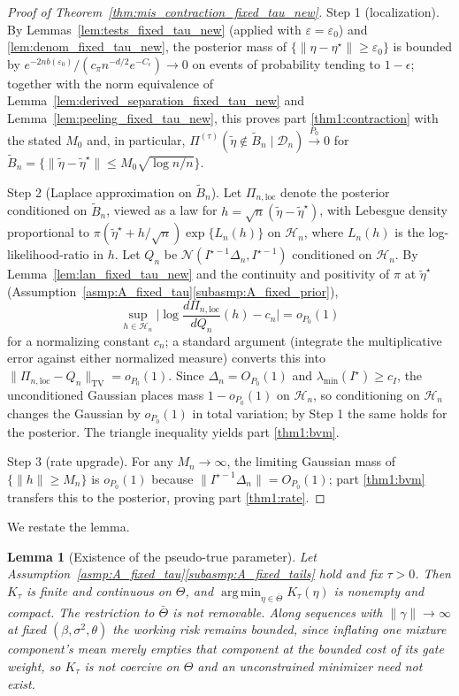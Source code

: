 \documentclass[11pt]{article}
\newtheorem{lemma}{Lemma}
\theoremstyle{definition}
\theoremstyle{plain}
\DeclareMathOperator*{\argmin}{arg\,min}
\begin{document}
\begin{proof}[Proof of Theorem~\ref{thm:mis_contraction_fixed_tau_new}]
Step 1 (localization). By Lemmas~\ref{lem:tests_fixed_tau_new} (applied with $\varepsilon=\varepsilon_0$) and \ref{lem:denom_fixed_tau_new}, the posterior mass of $\{\|\eta-\eta^\star\|\ge\varepsilon_0\}$ is bounded by
$e^{-2nb(\varepsilon_0)}/(c_\pi n^{-d/2}e^{-C_\epsilon})\to0$
on events of probability tending to $1-\epsilon$; together with the norm equivalence of Lemma~\ref{lem:derived_separation_fixed_tau_new} and Lemma~\ref{lem:peeling_fixed_tau_new}, this proves part \ref{thm1:contraction} with the stated $M_0$ and, in particular,
$\Pi^{(\tau)}(\tilde\eta\notin\tilde B_n\mid\mathcal D_n)\xrightarrow{P_0}0$ for
$\tilde B_n=\{\|\tilde\eta-\tilde\eta^\star\|\le M_0\sqrt{\log n/n}\}$.

Step 2 (Laplace approximation on $\tilde B_n$). Let $\Pi_{n,\mathrm{loc}}$ denote the posterior conditioned on $\tilde B_n$, viewed as a law for $h=\sqrt n(\tilde\eta-\tilde\eta^\star)$, with Lebesgue density proportional to
$\pi(\tilde\eta^\star+h/\sqrt n)\exp\{L_n(h)\}$ on $\mathcal H_n$, where $L_n(h)$ is the log-likelihood-ratio in $h$. Let $Q_n$ be $\mathcal N(I^{\star-1}\Delta_n,I^{\star-1})$ conditioned on $\mathcal H_n$. By Lemma~\ref{lem:lan_fixed_tau_new} and the continuity and positivity of $\pi$ at $\tilde\eta^\star$ (Assumption~\ref{asmp:A_fixed_tau}\ref{subasmp:A_fixed_prior}),
\[
\sup_{h\in\mathcal H_n}\Big|\log\frac{d\Pi_{n,\mathrm{loc}}}{dQ_n}(h)-c_n\Big|=o_{P_0}(1)
\]
for a normalizing constant $c_n$; a standard argument (integrate the multiplicative error against either normalized measure) converts this into
$\|\Pi_{n,\mathrm{loc}}-Q_n\|_{\mathrm{TV}}=o_{P_0}(1)$. Since $\Delta_n=O_{P_0}(1)$ and $\lambda_{\min}(I^\star)\ge c_I$, the unconditioned Gaussian places mass $1-o_{P_0}(1)$ on $\mathcal H_n$, so conditioning on $\mathcal H_n$ changes the Gaussian by $o_{P_0}(1)$ in total variation; by Step 1 the same holds for the posterior. The triangle inequality yields part \ref{thm1:bvm}.

Step 3 (rate upgrade). For any $M_n\to\infty$, the limiting Gaussian mass of $\{\|h\|\ge M_n\}$ is $o_{P_0}(1)$ because $\|I^{\star-1}\Delta_n\|=O_{P_0}(1)$; part \ref{thm1:bvm} transfers this to the posterior, proving part \ref{thm1:rate}.
\end{proof}

We restate the lemma.

\begin{lemma}[Existence of the pseudo-true parameter]
\label{lem:exist_pseudotrue_fixed_tau_new}
Let Assumption~\ref{asmp:A_fixed_tau}\ref{subasmp:A_fixed_tails} hold and fix $\tau>0$. Then $K_\tau$ is finite and continuous on $\Theta$, and $\argmin_{\eta\in\bar\Theta}K_\tau(\eta)$ is nonempty and compact. The restriction to $\bar\Theta$ is not removable. Along sequences with $\|\gamma\|\to\infty$ at fixed $(\beta,\sigma^2,\theta)$ the working risk remains bounded, since inflating one mixture component's mean merely empties that component at the bounded cost of its gate weight, so $K_\tau$ is not coercive on $\Theta$ and an unconstrained minimizer need not exist.
\end{lemma}
\end{document}
